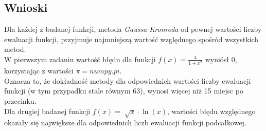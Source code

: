 \documentclass{article}
\begin{document}
\subsection*{Wnioski}
\null\quad Dla każdej z badanej funkcji, metoda \textit{Gaussa-Kronroda} od
pewnej wartości liczby ewaluacji funkcji, przyjmuje najmniejszą wartość
względnego spośród wszystkich metod. \\
\null\quad W pierwszym zadaniu wartość błędu dla funkcji
$f(x)=\frac{4}{1+x^2}$ wyniósł 0, korzystając z wartości $\pi = numpy.pi$.\\
Oznacza to, że dokładność metody dla odpowiednich wartości
liczby ewaluacji funkcji (w tym przypadku stale równym 63), 
wynosi więcej niż 15 miejsc po przecinku. \\
\null\quad Dla drugiej badanej funkcji $f(x) = \sqrt[]{x}\cdot \ln(x)$,
wartości błędu względnego okazały się największe dla odpowiednich liczb ewaluacji
funkcji podcałkowej.
\end{document}
